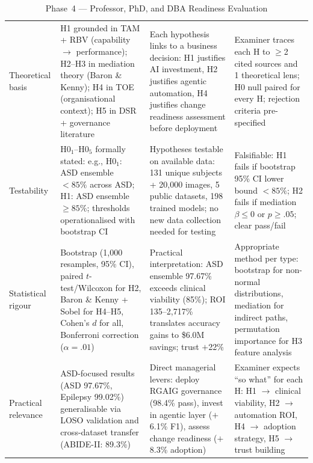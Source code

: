\begin{xltabular}{\textwidth}{@{} l X X X @{}}
\caption{Phase~4 --- Professor, PhD, and DBA Readiness Evaluation}
\label{tab:phase4_readiness}\\
\toprule
{} &  &  &  \\
\midrule
\endfirsthead
\endhead
\bottomrule
\endlastfoot
Theoretical basis      & H1 grounded in TAM + RBV (capability $\rightarrow$ performance); H2--H3 in mediation theory (Baron \& Kenny); H4 in TOE (organisational context); H5 in DSR + governance literature & Each hypothesis links to a business decision: H1 justifies AI investment, H2 justifies agentic automation, H4 justifies change readiness assessment before deployment & Examiner traces each H to $\geq$2 cited sources and 1 theoretical lens; H0 null paired for every H; rejection criteria pre-specified \\
\addlinespace
Testability            & H0$_1$--H0$_5$ formally stated: e.g., H0$_1$: ASD ensemble $< 85\%$ across ASD; H1: ASD ensemble $\geq 85\%$; thresholds operationalised with bootstrap CI & Hypotheses testable on available data: 131 unique subjects + 20{,}000 images, 5 public datasets, 198 trained models; no new data collection needed for testing & Falsifiable: H1 fails if bootstrap 95\% CI lower bound $< 85\%$; H2 fails if mediation $\beta \leq 0$ or $p \geq .05$; clear pass/fail \\
\addlinespace
Statistical rigour     & Bootstrap (1,000 resamples, 95\% CI), paired $t$-test/Wilcoxon for H2, Baron \& Kenny + Sobel for H4--H5, Cohen's $d$ for all, Bonferroni correction ($\alpha = .01$) & Practical interpretation: ASD ensemble 97.67\% exceeds clinical viability (85\%); ROI 135--2{,}717\% translates accuracy gains to \$6.0M savings; trust $+$22\% & Appropriate method per type: bootstrap for non-normal distributions, mediation for indirect paths, permutation importance for H3 feature analysis \\
\addlinespace
Practical relevance    & ASD-focused results (ASD 97.67\%, Epilepsy 99.02\%) generalisable via LOSO validation and cross-dataset transfer (ABIDE-II: 89.3\%) & Direct managerial levers: deploy RGAIG governance (98.4\% pass), invest in agentic layer ($+$6.1\% F1), assess change readiness ($+$8.3\% adoption) & Examiner expects ``so what'' for each H: H1 $\rightarrow$ clinical viability, H2 $\rightarrow$ automation ROI, H4 $\rightarrow$ adoption strategy, H5 $\rightarrow$ trust building \\

\end{xltabular}
